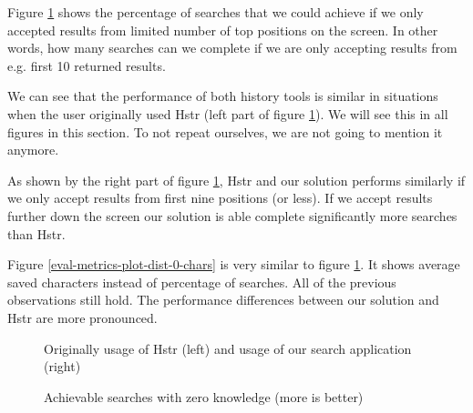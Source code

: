 Figure \ref{eval-metrics-plot-dist-0-cmds} shows the percentage of searches that we could achieve if we only accepted results from limited number of top positions on the screen. In other words, how many searches can we complete if we are only accepting results from e.g. first 10 returned results.

We can see that the performance of both history tools is similar in situations when the user originally used Hstr (left part of figure \ref{eval-metrics-plot-dist-0-cmds}). We will see this in all figures in this section. To not repeat ourselves, we are not going to mention it anymore.

As shown by the right part of figure \ref{eval-metrics-plot-dist-0-cmds}, Hstr and our solution performs similarly if we only accept results from first nine positions (or less). If we accept results further down the screen our solution is able complete significantly more searches than Hstr.


Figure \ref{eval-metrics-plot-dist-0-chars} is very similar to figure \ref{eval-metrics-plot-dist-0-cmds}. It shows average saved characters instead of percentage of searches. All of the previous observations still hold. The performance differences between our solution and Hstr are more pronounced. 


\begin{figure}
\centering
{}\hfill
{}
\caption{Achievable searches with zero knowledge (more is better)}
\small{Originally usage of Hstr (left) and usage of our search application (right)}
\label{eval-metrics-plot-dist-0-cmds}
\end{figure}

